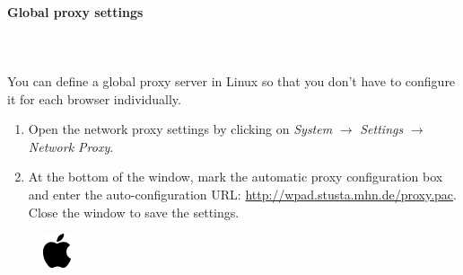 \documentclass[a4paper,12pt]{scrartcl}
\begin{document}
\paragraph*{Global proxy settings} ~\\
\\
You can define a global proxy server in Linux so that you don't have to configure it for each browser individually.
\begin{enumerate}
	\item Open the network proxy settings by clicking on \emph{System} $\rightarrow$ \emph{Settings} $\rightarrow$ \emph{Network Proxy}.
    \item At the bottom of the window, mark the automatic proxy configuration box and enter the auto-configuration URL: \url{http://wpad.stusta.mhn.de/proxy.pac}. Close the window to save the settings.
\end{enumerate}



\newpage
\enlargethispage{20pt}

\begin{figure}[t!]
    \raggedleft
    \vspace{-20pt}
    \includegraphics[height=1cm,keepaspectratio]{Bilder/apple_logo_neu}
    \vspace{-20pt}
\end{figure}
\end{document}
